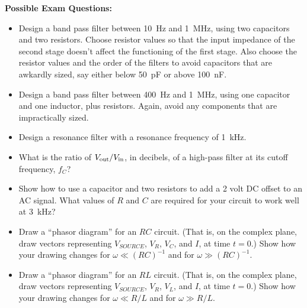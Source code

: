 \pagebreak[3]
\textbf{Possible Exam Questions:}

\begin{itemize}

\item Design a band pass filter between 10~Hz and 1~MHz, using two capacitors and two resistors.  Choose resistor values so that the input impedance of the second stage doesn't affect the functioning of the first stage.  Also choose the resistor values and the order of the filters to avoid capacitors that are awkardly sized, say either below 50~pF or above 100~nF.

\item Design a band pass filter between 400~Hz and 1~MHz, using one capacitor and one inductor, plus resistors.  Again, avoid any components that are impractically sized.

\item Design a resonance filter with a resonance frequency of 1~kHz. 

\item What is the ratio of $V_{\rm out}/V_{\rm in}$, in decibels, of a high-pass filter at its cutoff frequency, $f_C$?

\item Show how to use a capacitor and two resistors to add a 2 volt DC offset to an AC signal.  What values of $R$ and $C$ are required for your circuit to work well at 3~kHz?


\item Draw a ``phasor diagram'' for an $RC$ circuit.  (That is, on the complex plane, draw vectors representing $V_{SOURCE}$, $V_R$, $V_C$, and $I$, at time $t=0$.)  Show how your drawing changes for $\omega \ll (RC)^{-1}$ and for $\omega \gg (RC)^{-1}$.

\item Draw a ``phasor diagram'' for an $RL$ circuit.  (That is, on the complex plane, draw vectors representing $V_{SOURCE}$, $V_R$, $V_L$, and $I$, at time $t=0$.)  Show how your drawing changes for $\omega \ll R/L$ 
and for $\omega \gg R/L$.

\end{itemize}





